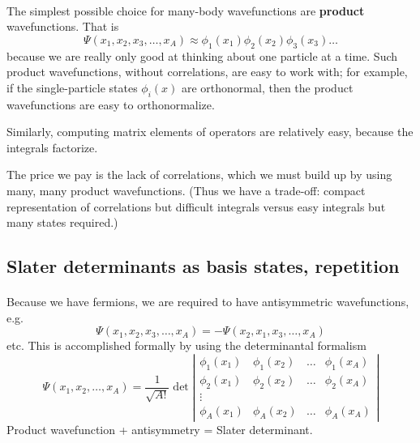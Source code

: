 \documentclass[%
twoside,                 %
final,                   %
10pt]{article}
\begin{document}
\paragraph{}
The simplest possible choice for many-body wavefunctions are \textbf{product} wavefunctions.
That is
\[ 
\Psi(x_1, x_2, x_3, \ldots, x_A) \approx \phi_1(x_1) \phi_2(x_2) \phi_3(x_3) \ldots
\]
because we are really only good  at thinking about one particle at a time. Such 
product wavefunctions, without correlations, are easy to 
work with; for example, if the single-particle states $\phi_i(x)$ are orthonormal, then 
the product wavefunctions are easy to orthonormalize.   

Similarly, computing matrix elements of operators are relatively easy, because the 
integrals factorize.


The price we pay is the lack of correlations, which we must build up by using many, many product 
wavefunctions. (Thus we have a trade-off: compact representation of correlations but 
difficult integrals versus easy integrals but many states required.)



\subsection*{Slater determinants as basis states, repetition}

\paragraph{}
Because we have fermions, we are required to have antisymmetric wavefunctions, e.g.
\[
\Psi(x_1, x_2, x_3, \ldots, x_A) = - \Psi(x_2, x_1, x_3, \ldots, x_A)
\]
etc. This is accomplished formally by using the determinantal formalism
\[
\Psi(x_1, x_2, \ldots, x_A) 
= \frac{1}{\sqrt{A!}} 
\det \left | 
\begin{array}{cccc}
\phi_1(x_1) & \phi_1(x_2) & \ldots & \phi_1(x_A) \\
\phi_2(x_1) & \phi_2(x_2) & \ldots & \phi_2(x_A) \\
 \vdots & & &  \\
\phi_A(x_1) & \phi_A(x_2) & \ldots & \phi_A(x_A) 
\end{array}
\right |
\]
Product wavefunction + antisymmetry = Slater determinant.
\end{document}
